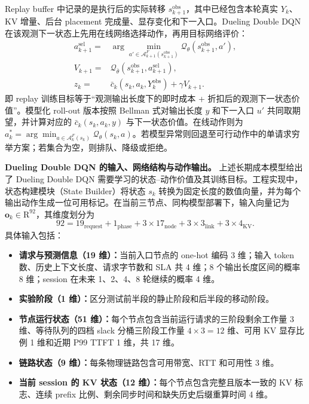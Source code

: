 Replay buffer 中记录的是执行后的实际转移 \(s_{k+1}^{\mathrm{obs}}\)，其中已经包含本轮真实 \(Y_k\)、KV 增量、后台 placement 完成量、显存变化和下一入口。Dueling Double DQN 在该观测下一状态上先用在线网络选择动作，再用目标网络评价：
\[
\begin{array}{rl}
a_{k+1}^{\mathrm{sel}}
={}&\displaystyle\arg\min_{a'\in\mathcal A_{k+1}^F(s_{k+1}^{\mathrm{obs}})}
\mathcal Q_\theta(s_{k+1}^{\mathrm{obs}},a'),\\
V_{k+1}
={}&\mathcal Q_{\bar\theta}
(s_{k+1}^{\mathrm{obs}},a_{k+1}^{\mathrm{sel}}),\\
z_k
={}&\bar c_k(s_k,a_k,Y_k^{\mathrm{obs}})
+\gamma V_{k+1}.
\end{array}
\]
即 replay 训练目标等于“观测输出长度下的即时成本 + 折扣后的观测下一状态价值”。模型化 roll-out 版本按照 Bellman 式对输出长度 \(y\) 和下一入口 \(u'\) 共同取期望，并计算对应的 \(\bar c_k(s_k,a_k,y)\) 与下一状态价值。在线动作则为 \(a_k^*=\arg\min_{a\in\mathcal A_k^F(s_k)}\mathcal Q_\theta(s_k,a)\)。若模型异常则回退至可行动作中的单请求穷举方案；若集合为空，则排队、降级或拒绝。

\noindent\textbf{Dueling Double DQN 的输入、网络结构与动作输出。}
上述长期成本模型给出了 Dueling Double DQN 需要学习的状态--动作价值及其训练目标。工程实现中，状态构建模块（State Builder）将状态 \(s_k\) 转换为固定长度的数值向量，并为每个输出动作生成一位可用标记。在当前三节点、同构模型部署下，输入向量记为 \(\mathbf o_k\in\mathrm R^{92}\)，其维度划分为
\[
92
=
19_{\mathrm{request}}
+1_{\mathrm{phase}}
+3\times17_{\mathrm{node}}
+3\times3_{\mathrm{link}}
+3\times4_{\mathrm{KV}}.
\]
具体输入包括：
\begin{itemize}
    \item \textbf{请求与预测信息（19 维）：}当前入口节点的 one-hot 编码 3 维；输入 token 数、历史上下文长度、请求字节数和 SLA 共 4 维；8 个输出长度区间的概率 8 维；session 在未来 1、2、4、8 轮继续的概率 4 维。
    \item \textbf{实验阶段（1 维）：}区分测试前半段的静止阶段和后半段的移动阶段。
    \item \textbf{节点运行状态（51 维）：}每个节点包含当前运行请求的三阶段剩余工作量 3 维、等待队列的四档 slack 分桶三阶段工作量 \(4\times3=12\) 维、可用 KV 显存比例 1 维和近期 P99 TTFT 1 维，共 17 维。
    \item \textbf{链路状态（9 维）：}每条物理链路包含可用带宽、RTT 和可用性 3 维。
    \item \textbf{当前 session 的 KV 状态（12 维）：}每个节点包含完整且版本一致的 KV 标志、连续 prefix 比例、剩余同步时间和缺失历史后缀重算时间 4 维。
\end{itemize}

